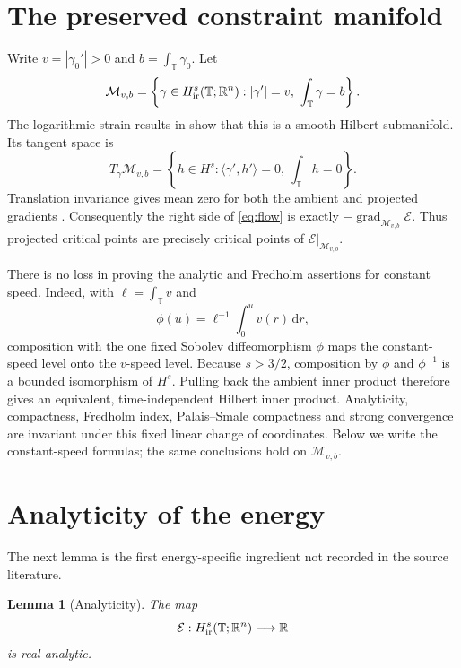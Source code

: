 \documentclass[11pt]{article}
\newtheorem{lemma}[theorem]{Lemma}
\theoremstyle{remark}
\newcommand{\T}{\mathbb T}
\newcommand{\R}{\mathbb R}
\newcommand{\E}{\mathcal E}
\newcommand{\M}{\mathcal M}
\newcommand{\dd}{\,\mathrm d}
\newcommand{\grad}{\operatorname{grad}}
\begin{document}
\section{The preserved constraint manifold}

Write $v=|\gamma_0'|>0$ and $b=\int_\T\gamma_0$.  Let
\[
 \M_{v,b}=\left\{\gamma\in H^s_{\rm ir}(\T;\R^n):
 |\gamma'|=v,\ \int_\T\gamma=b\right\}.
\]
The logarithmic-strain results in \cite[Section 5]{KSSM} show that this is a
smooth Hilbert submanifold.  Its tangent space is
\[
 T_\gamma\M_{v,b}=\left\{h\in H^s:
 \langle\gamma',h'\rangle=0,\ \int_\T h=0\right\}.
\]
Translation invariance gives mean zero for both the ambient and projected
gradients \cite[Lemma 3.2]{KSSM}.  Consequently the right side of
\eqref{eq:flow} is exactly $-\grad_{\M_{v,b}}\E$.  Thus projected critical
points are precisely critical points of $\E|_{\M_{v,b}}$.

There is no loss in proving the analytic and Fredholm assertions for constant
speed.  Indeed, with $\ell=\int_\T v$ and
\[
 \phi(u)=\ell^{-1}\int_0^u v(r)\dd r,
\]
composition with the one fixed Sobolev diffeomorphism $\phi$ maps the
constant-speed level onto the $v$-speed level.  Because $s>3/2$, composition
by $\phi$ and $\phi^{-1}$ is a bounded isomorphism of $H^s$.  Pulling back the
ambient inner product therefore gives an equivalent, time-independent Hilbert
inner product.  Analyticity, compactness, Fredholm index, Palais--Smale
compactness and strong convergence are invariant under this fixed linear
change of coordinates.  Below we write the constant-speed formulas; the
same conclusions hold on $\M_{v,b}$.

\section{Analyticity of the energy}

The next lemma is the first energy-specific ingredient not recorded in the
source literature.

\begin{lemma}[Analyticity]\label{lem:analytic}
The map
\[
 \E:H^s_{\rm ir}(\T;\R^n)\longrightarrow\R
\]
is real analytic.
\end{lemma}
\end{document}
